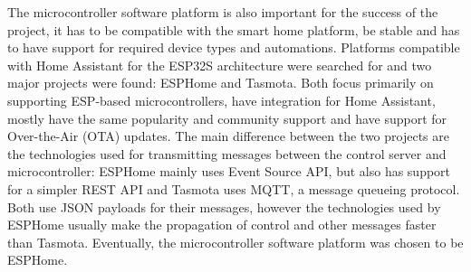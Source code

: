 The microcontroller software platform is also important for the success of the project, it has to be compatible with the smart home platform, be stable and has to have support for required device types and automations. Platforms compatible with Home Assistant for the ESP32S architecture were searched for and two major projects were found: ESPHome and Tasmota. Both focus primarily on supporting ESP-based microcontrollers, have integration for Home Assistant, mostly have the same popularity and community support and have support for Over-the-Air (OTA) updates. \cite{ESPHomeHomepage} \cite{TasmotaHomepage} \cite{ESPHomeOTA} \cite{TasmotaOTA} The main difference between the two projects are the technologies used for transmitting messages between the control server and microcontroller: ESPHome mainly uses Event Source API, but also has support for a simpler REST API and Tasmota uses MQTT, a message queueing protocol. \cite{ESPHomeWebAPI} \cite{TasmotaMQTT} Both use JSON payloads for their messages, however the technologies used by ESPHome usually make the propagation of control and other messages faster than Tasmota. Eventually, the microcontroller software platform was chosen to be ESPHome.
